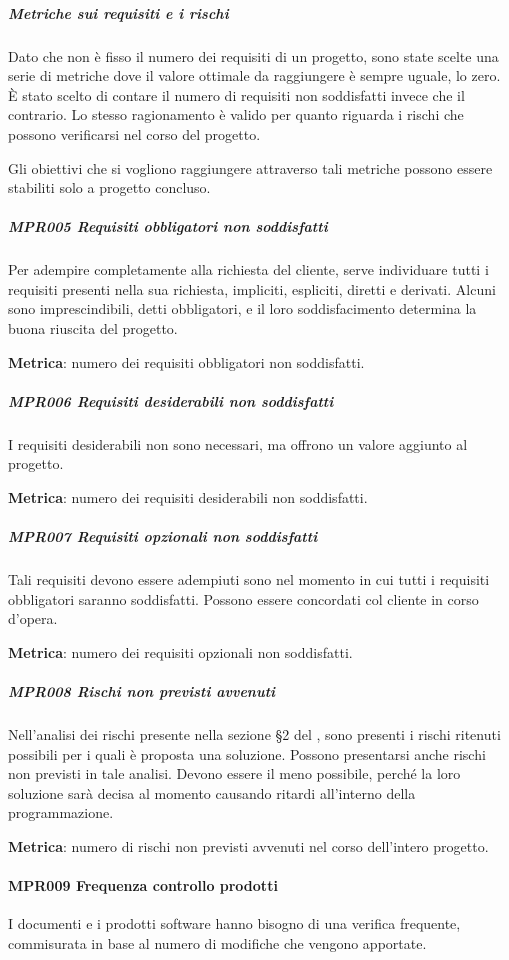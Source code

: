 				\subparagraph*{Metriche sui requisiti e i rischi}
				Dato che non è fisso il numero dei requisiti di un progetto, sono state scelte una serie di metriche dove il valore ottimale da raggiungere è sempre uguale,
				lo zero. È stato scelto di contare il numero di requisiti non soddisfatti invece che il contrario. Lo stesso ragionamento è valido per quanto
				riguarda i rischi che possono verificarsi nel corso del progetto.

				Gli obiettivi che si vogliono raggiungere attraverso tali metriche possono essere stabiliti solo a progetto concluso.

				\subparagraph{MPR005 Requisiti obbligatori non soddisfatti}
				Per adempire completamente alla richiesta del cliente, serve individuare tutti i requisiti presenti nella sua richiesta, impliciti, espliciti, diretti e
				derivati. Alcuni sono imprescindibili, detti obbligatori, e il loro soddisfacimento determina la buona riuscita del progetto.

				\textbf{Metrica}: numero dei requisiti obbligatori non soddisfatti.

				\subparagraph{MPR006 Requisiti desiderabili non soddisfatti}
				I requisiti desiderabili non sono necessari, ma offrono un valore aggiunto al progetto.

				\textbf{Metrica}: numero dei requisiti desiderabili non soddisfatti.

				\subparagraph{MPR007 Requisiti opzionali non soddisfatti}
				Tali requisiti devono essere adempiuti sono nel momento in cui tutti i requisiti obbligatori saranno soddisfatti.
				Possono essere concordati col cliente in corso d'opera.

				\textbf{Metrica}: numero dei requisiti opzionali non soddisfatti.

				\subparagraph{MPR008 Rischi non previsti avvenuti} %
				Nell'analisi dei rischi presente nella sezione §2 del \Doc{\PdPv}, sono presenti i rischi ritenuti possibili per i quali è proposta una soluzione.
				Possono presentarsi anche rischi non previsti in tale analisi. Devono essere il meno possibile, perché la loro soluzione sarà decisa
				al momento causando ritardi all'interno della programmazione.

				\textbf{Metrica}: numero di rischi non previsti avvenuti nel corso dell'intero progetto.

				\paragraph{MPR009 Frequenza controllo prodotti}
				I documenti e i prodotti software hanno bisogno di una verifica frequente, commisurata in base al numero di modifiche che vengono apportate.

